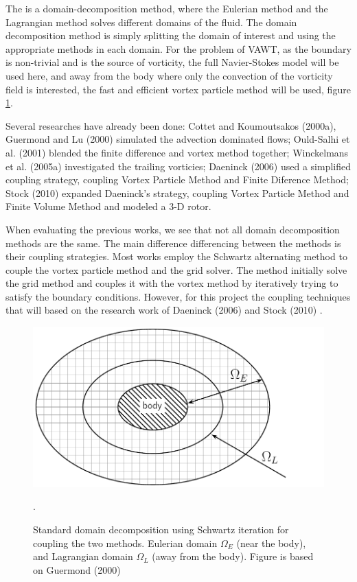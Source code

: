 The  is a domain-decomposition method, where the Eulerian method and the Lagrangian method solves different domains of the fluid. The domain decomposition method is simply splitting the domain of interest and using the appropriate methods in each domain. For the problem of VAWT, as the boundary is non-trivial and is the source of vorticity, the full Navier-Stokes model will be used here, and away from the body where only the convection of the vorticity field is interested, the fast and efficient vortex particle method will be used, figure \ref{fig:domainDecomposition}.

Several researches have already been done: Cottet and Koumoutsakos (2000a)\cite{Cottet2000a}, Guermond and Lu (2000) \cite{Guermond2000} simulated the advection dominated flows; Ould-Salhi et al. (2001) \cite{Ould-Salihi2001} blended the finite difference and vortex method together; Winckelmans et al. (2005a) \cite{Winckelmans2005a} investigated the trailing vorticies; Daeninck (2006) \cite{Daeninck2006} used a simplified coupling strategy, coupling Vortex Particle Method and Finite Diference Method; Stock (2010) \cite{Stock} expanded Daeninck's strategy, coupling Vortex Particle Method and Finite Volume Method and modeled a 3-D rotor.

When evaluating the previous works, we see that not all domain decomposition methods are the same. The main difference differencing between the methods is their coupling strategies. Most works employ the Schwartz alternating method to couple the vortex particle method and the grid solver. The method initially solve the grid method and couples it with the vortex method by iteratively trying to satisfy the boundary conditions. However, for this project the coupling techniques that will based on the research work of Daeninck (2006) \cite{Daeninck2006} and Stock (2010) \cite{Stock}.

	\begin{figure}[!t]
		\centering
		\includegraphics[width=0.6\linewidth]{figures/introduction/domainDecomposition_typical.pdf}
		\caption{Standard domain decomposition using Schwartz iteration for coupling the two methods. Eulerian domain $\Omega_E$ (near the body), and Lagrangian domain $\Omega_L$ (away from the body). Figure is based on Guermond (2000) \cite{Guermond2000}}.
		\label{fig:domainDecomposition}
	\end{figure}


